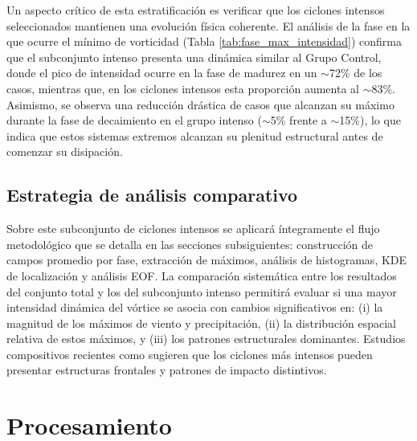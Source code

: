 Un aspecto crítico de esta estratificación es verificar que los ciclones intensos seleccionados mantienen una evolución física coherente. El análisis de la fase en la que ocurre el mínimo de vorticidad (Tabla \ref{tab:fase_max_intensidad}) confirma que el subconjunto intenso presenta una dinámica similar al Grupo Control, donde el pico de intensidad ocurre en la fase de madurez en un $\sim$72\% de los casos, mientras que, en los ciclones intensos esta proporción aumenta al $\sim$83\%. Asimismo, se observa una reducción drástica de casos que alcanzan su máximo durante la fase de decaimiento en el grupo intenso ($\sim$5\% frente a $\sim$15\%), lo que indica que estos sistemas extremos alcanzan su plenitud estructural antes de comenzar su disipación.



\subsection{Estrategia de análisis comparativo}

Sobre este subconjunto de ciclones intensos se aplicará íntegramente el flujo metodológico que se detalla en las secciones subsiguientes: construcción de campos promedio por fase, extracción de máximos, análisis de histogramas, KDE de localización y análisis EOF. La comparación sistemática entre los resultados del conjunto total y los del subconjunto intenso permitirá evaluar si una mayor intensidad dinámica del vórtice se asocia con cambios significativos en: (i) la magnitud de los máximos de viento y precipitación, (ii) la distribución espacial relativa de estos máximos, y (iii) los patrones estructurales dominantes. Estudios compositivos recientes como \citet{andrade2024composite} sugieren que los ciclones más intensos pueden presentar estructuras frontales y patrones de impacto distintivos.


\section{Procesamiento}\label{sec:procesamiento_lagrangiano}

